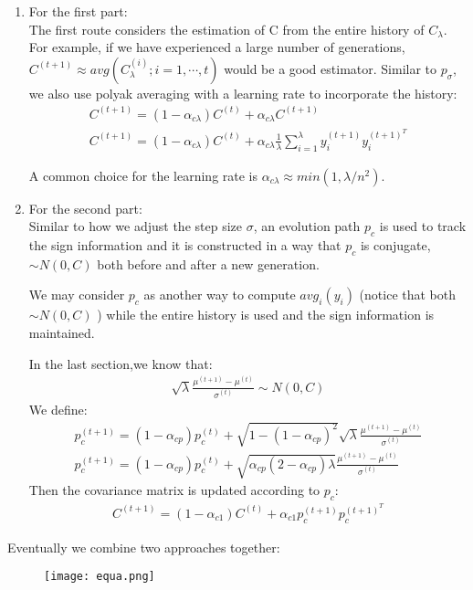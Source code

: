 \documentclass[12pt]{article}
\begin{document}
\begin{enumerate}
	\item For the first part:\\
	The first route considers the estimation of C from the entire history
	 of ${C_\lambda}$. 
	For example, if we have experienced a large number of generations,
	$C^{(t+1)}\approx avg(C_\lambda^{(i)};i=1,\cdots,t)$ 
 would be a good estimator. Similar to $p_\sigma$, we also use polyak averaging with a learning rate to incorporate the history:
 \begin{gather}
	C^{(t+1)}=(1-\alpha_{c\lambda})C^{(t)}+\alpha_{c\lambda}C^{(t+1)}\\
    C^{(t+1)}=(1-\alpha_{c\lambda})C^{(t)}+\alpha_{c\lambda}\frac{1}{\lambda}\sum_{i=1}^\lambda y_i^{(t+1)}y_i^{(t+1)^T}
 \end{gather}

 A common choice for the learning rate is $\alpha_{c\lambda}\approx min(1,\lambda/n^2)$.
	\item For the second part:\\
	Similar to how we adjust the step size $\sigma$,
	 an evolution path $p_c$ is used to track the sign information and 
	 it is constructed in a way that $p_c$ is conjugate, $\sim N(0,C)$
	 both before and after a new generation.	

	 We may consider $p_c$ as another way to compute $avg_i(y_i)$ 
	 (notice that both $\sim N(0,C)$ ) while the entire history 
	 is used and the sign information is maintained.

	 In the last section,we know that:
	 \begin{align} 
		\sqrt{\lambda}\frac{\mu^{(t+1)}-\mu^{(t)}}{\sigma^{(t)}}\sim N(0,C)
	 \end{align}
	 We define:
	 \begin{gather}
		p_c^{(t+1)}=(1-\alpha_{cp})p_c^{(t)}+\sqrt{1-(1-\alpha_{cp})^2}\sqrt{\lambda}\frac{\mu^{(t+1)}-\mu^{(t)}}{\sigma^{(t)}}\\
		p_c^{(t+1)}=(1-\alpha_{cp})p_c^{(t)}+\sqrt{\alpha_{cp}(2-\alpha_{cp})\lambda}\frac{\mu^{(t+1)}-\mu^{(t)}}{\sigma^{(t)}}
	 \end{gather}
	 Then the covariance matrix is updated according to $p_c$:
	 \begin{gather}
		C^{(t+1)}=(1-\alpha_{c1})C^{(t)}+\alpha_{c1}p_c^{(t+1)}p_c^{(t+1)^T}
	 \end{gather}
\end{enumerate}

Eventually we combine two approaches together:
\begin{figure}[htbp]
	\centering
	\texttt{[image: equa.png]}
\end{figure}
\end{document}
